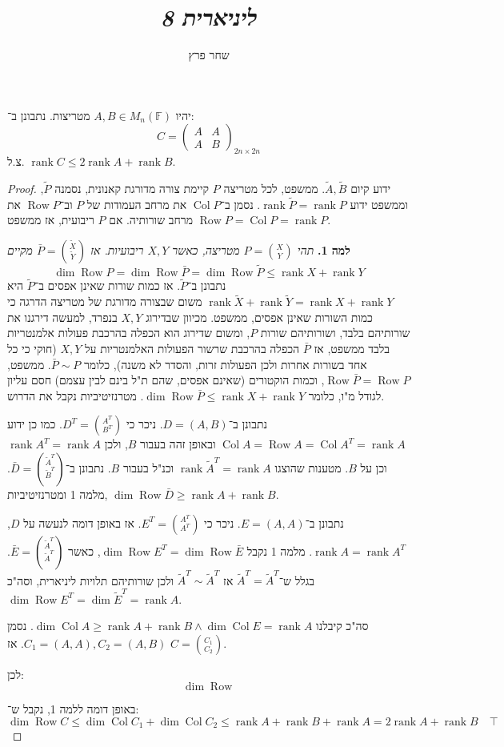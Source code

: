 \documentclass[]{article}
\author{שחר פרץ}
\title{\textit{ליניארית 8}}
\DeclareMathOperator\col   {Col}
\newcommand\F         {\mathbb{F}}
\newcommand\pms[1]    {\begin{pmatrix}
		#1
\end{pmatrix}}
\DeclareMathOperator{\rk}     {rank}
\DeclareMathOperator{\cols}   {Col}
\DeclareMathOperator{\rows}   {Row}
\newcommand\tl    {\tilde}
\begin{document}
	\maketitle
	\section{}
	יהיו $A, B \in M_n(\F)$ מטריצות. נתבונן ב־: 
	\[ C = \pms{A & A \\ A & B}_{2n \times 2n} \]
	צ.ל. $\rk C \le 2\rk A + \rk B$. 
	\begin{proof}
			ידוע קיום $\tl A, \tl B$. ממשפט, לכל מטריצה $P$ קיימת צורה מדורגת קאנונית, נסמנה $\tl P$, וממשפט ידוע $\rk \tl P = \rk P$. נסמן ב־$\cols P$ את מרחב העמודות של $P$ וב־$\rows P$ את מרחב שורותיה. אם $P$ ריבועית, אז ממשפט $\rows P = \cols P = \rk P$. 
			
			
			
			\textbf{למה 1. }\textit{תהי $P = \binom{X}{Y}$ מטריצה, כאשר $X, Y$ ריבועיות. אז $\bar P = \binom{\tl X }{\tl Y}$ מקיים }
			\[\dim \rows P = \dim \rows \bar P = \dim \rows \tl P \le \rk X + \rk Y\]
			נתבונן ב־$\tl P$. 
			אז כמות שורות שאינן אפסים ב־$\tl P$ היא $\rk \tl X + \rk \tl Y = \rk X + \rk Y$ משום שבצורה מדורגת של מטריצה הדרגה כי כמות השורות שאינן אפסים, ממשפט. מכיוון שבדירוג $X, Y$ בנפרד, למעשה דירגנו את שורותיהם בלבד, ושורותיהם שורות $P$, ומשום שדירוג הוא הכפלה בהרכבת פעולות אלמנטריות בלבד ממשפט, אז $\bar P$ הכפלה בהרכבת שרשור הפעולות האלמנטריות על $X, Y$ (חוקי כי כל אחד בשורות אחרות ולכן הפעולות זרות, והסדר לא משנה), כלומר $\bar P \sim P$. ממשפט, $\rows \bar P = \rows P$, וכמות הוקטורים (שאינם אפסים, שהם ת"ל בינם לבין עצמם) חסם עליון לגודל מ"ו, כלומר $\dim \rows \bar P \le \rk X + \rk Y$. מטרנזיטיביות נקבל את הדרוש. 
			
			נתבונן ב־$D = (A, B)$. ניכר כי $D^T = \binom{A^T}{B^T}$. כמו כן ידוע $\cols A = \rows A = \cols A^T = \rk A$ ובאופן זהה בעבור $B$, ולכן $\rk A^T = \rk A$ וכן על $B$. מטענות שהוצגו $\rk \tl A^T = \rk A$ וכנ"ל בעבור $B$. נתבונן ב־$\bar D = \binom{\tl A^T}{\tl B^T}$. מלמה 1 ומטרנזיטיביות, $\dim \rows \bar D \ge \rk A + \rk B$. 
			
			נתבונן ב־$E = (A, A)$. ניכר כי $E^T = \binom{A^T}{A^T}$. אז באופן דומה לנעשה על $D$, $\rk A = \rk A^T$. מלמה 1 נקבל $\dim \rows E^T = \dim \rows \bar E$, כאשר $\bar E = \binom{\tl A^T}{\tl A^T}$. בגלל ש־$\tl A^T = \tl A^T$ אז $\tl A^T \sim \tl A^T$ ולכן שורותיהם תלויות ליניארית, וסה"כ $\dim \rows E^T = \dim \tl E^T = \rk A$. 
			
			סה"כ קיבלנו $\dim \col A \ge \rk A + \rk B \land \dim \col E = \rk A$. נסמן $C_1 = (A, A), C_2 = (A, B)$. אז $C = \binom{C_1}{C_2}$. 
			
			לכן: 
			\[ \dim \rows  \]
			
			באופן דומה ללמה 1, נקבל ש־: 
			\[ \dim \rows C \le \dim \col C_1 + \dim \col C_2 \le \rk A + \rk B + \rk A = 2\rk A + \rk B \quad \top \]
	\end{proof}
	
\end{document}
